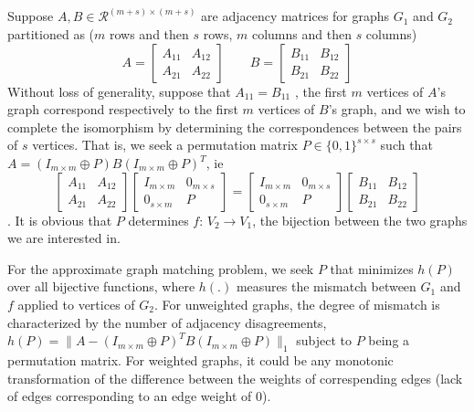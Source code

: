 \documentclass[12pt,oneside,final]{thesis}
\begin{document}
Suppose $A,B \in \mathcal{R}^{(m+s)\times (m+s)}$ are adjacency matrices for graphs $G_1$ and $G_2$
 partitioned as ($m$ rows and then $s$ rows, $m$ columns and then $s$ columns)
\[  A =\left [
\begin{array}{cc} A_{11} & A_{12} \\ A_{21} & A_{22} \end{array} \right ]
\ \ \ \ \ \ \ \ \ B =\left [
\begin{array}{cc} B_{11} & B_{12} \\ B_{21} & B_{22} \end{array} \right ]
\]
Without loss of generality, suppose that $A_{11}=B_{11}$ , \ie the first $m$ vertices
of $A$'s graph correspond respectively to the first $m$ vertices of $B$'s graph,
and we wish to complete the isomorphism by determining the correspondences between the pairs of $s$ vertices. 
That is, we seek a permutation matrix $P \in \{0,1\}^{s \times s}$ such that $A=(I_{m \times m}
\oplus P)B(I_{m \times m} \oplus P)^T$, ie
 \[
 \left [
\begin{array}{cc} A_{11} & A_{12} \\ A_{21} & A_{22} \end{array}
\right ]
\left [
\begin{array}{cc} I_{m \times m} & 0_{m \times s} \\ 0_{s \times m} & P \end{array}
\right ]
=
\left [
\begin{array}{cc} I_{m \times m} & 0_{m \times s} \\ 0_{s \times m} & P \end{array}
\right ]
\left [
\begin{array}{cc} B_{11} & B_{12} \\ B_{21} & B_{22} \end{array}
\right ] 
\].  It is obvious that $P$ determines $f$: $V_2 \rightarrow V_1$, the bijection  between the two graphs we are interested in.

For the approximate graph matching problem, we seek $P$ that minimizes $h(P)$ over all bijective functions, where $h(.)$ measures the mismatch between $G_1$ and $f$ applied to vertices of $G_2$.
For unweighted graphs, the degree of mismatch is characterized by the number of adjacency disagreements, \ie 
$h(P)=\|A- (I_{m \times m}\oplus P)^{T}B(I_{m \times m}\oplus P)\|_1$ subject to $P$ being a permutation matrix.
For weighted graphs, it could be any monotonic transformation of the difference between the weights of correspending edges (lack of edges corresponding to an edge weight of 0).
%
   
\end{document}
